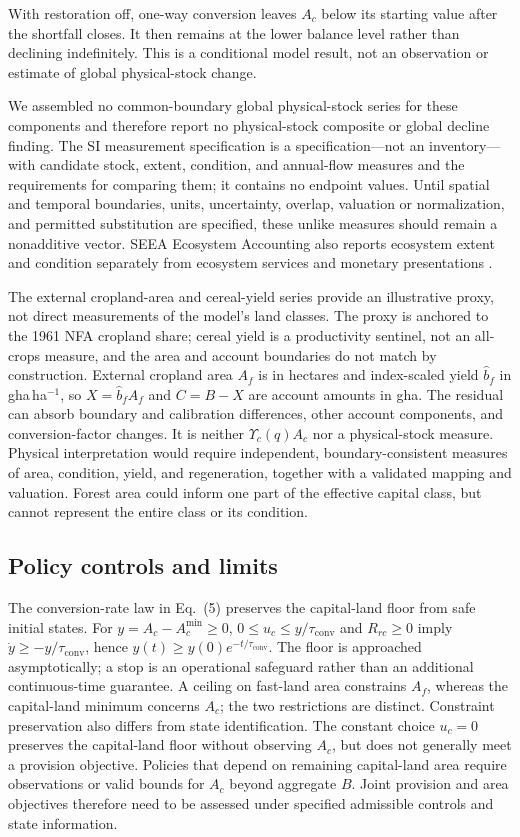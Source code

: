 \documentclass[preprint,12pt,authoryear]{elsarticle}
\newcommand{\Ups}{\Upsilon_c}
\newcommand{\Acmin}{A_c^{\min}}
\newcommand{\tconv}{\tau_{\mathrm{conv}}}
\begin{document}
With restoration off, one-way conversion leaves $A_c$ below its starting value after the shortfall closes. It then remains at the lower balance level rather than declining indefinitely. This is a conditional model result, not an observation or estimate of global physical-stock change.

We assembled no common-boundary global physical-stock series for these components and therefore report no physical-stock composite or global decline finding. The SI measurement specification is a specification—not an inventory—with candidate stock, extent, condition, and annual-flow measures and the requirements for comparing them; it contains no endpoint values. Until spatial and temporal boundaries, units, uncertainty, overlap, valuation or normalization, and permitted substitution are specified, these unlike measures should remain a nonadditive vector. SEEA Ecosystem Accounting also reports ecosystem extent and condition separately from ecosystem services and monetary presentations \citep{UN2021SEEA_EA}.

The external cropland-area and cereal-yield series provide an illustrative proxy, not direct measurements of the model's land classes. The proxy is anchored to the 1961 NFA cropland share; cereal yield is a productivity sentinel, not an all-crops measure, and the area and account boundaries do not match by construction. External cropland area $A_f$ is in hectares and index-scaled yield $\hat b_f$ in gha\,ha$^{-1}$, so $X=\hat b_fA_f$ and $C=B-X$ are account amounts in gha. The residual can absorb boundary and calibration differences, other account components, and conversion-factor changes. It is neither $\Ups(q)A_c$ nor a physical-stock measure. Physical interpretation would require independent, boundary-consistent measures of area, condition, yield, and regeneration, together with a validated mapping and valuation. Forest area could inform one part of the effective capital class, but cannot represent the entire class or its condition.

\subsection{Policy controls and limits}

The conversion-rate law in Eq.~(5) preserves the capital-land floor from safe initial states. For $y=A_c-\Acmin\ge0$, $0\le u_c\le y/\tconv$ and $R_{rc}\ge0$ imply $\dot y\ge-y/\tconv$, hence $y(t)\ge y(0)e^{-t/\tconv}$. The floor is approached asymptotically; a stop is an operational safeguard rather than an additional continuous-time guarantee. A ceiling on fast-land area constrains $A_f$, whereas the capital-land minimum concerns $A_c$; the two restrictions are distinct. Constraint preservation also differs from state identification. The constant choice $u_c=0$ preserves the capital-land floor without observing $A_c$, but does not generally meet a provision objective. Policies that depend on remaining capital-land area require observations or valid bounds for $A_c$ beyond aggregate $B$. Joint provision and area objectives therefore need to be assessed under specified admissible controls and state information.
\end{document}
